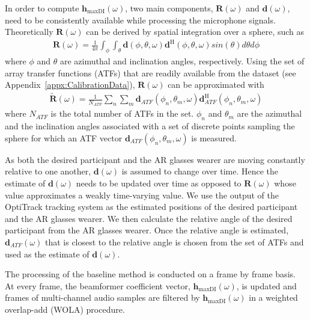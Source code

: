 \documentclass[journal]{IEEEtran}
\begin{document}
In order to compute $\mathbf{h}_{\mathrm{maxDI}}(\omega)$, two main components, $\mathbf{R}(\omega)$ and $\mathbf{d}(\omega)$, need to be consistently available while processing the microphone signals.
Theoretically $\mathbf{R}(\omega)$  can be  derived by spatial integration over a sphere, such as
\begin{align}
\mathbf{R}(\omega) = \frac{1}{4\pi} \int_{\phi} \int_{\theta} \mathbf{d}(\phi, \theta, \omega) \mathbf{d}^{\mathrm{H}}(\phi, \theta, \omega) sin(\theta)d\theta d\phi
\label{eq:R_original}
\end{align}
where $\phi$ and $\theta$ are azimuthal and inclination angles, respectively. Using the set of array transfer functions (ATFs) that are readily available from the dataset (see Appendix~\ref{appx:CalibrationData}), $\mathbf{R}(\omega)$ can be approximated with
\begin{align}
\mathbf{\tilde{R}}(\omega) = \frac{1}{N_{ATF}}\sum_{n} \sum_{m} \mathbf{d}_{ATF}(\phi_{n}, \theta_{m}, \omega)\mathbf{d}^{\mathrm{H}}_{ATF}(\phi_{n}, \theta_{m}, \omega)
\end{align}
where $N_{ATF}$ is the total number of ATFs in the set. $\phi_{n}$ and $\theta_{m}$ are the azimuthal and the inclination angles associated with a set of discrete points sampling the sphere for which an ATF vector $\mathbf{d}_{ATF}(\phi_{n}, \theta_{m}, \omega)$ is measured.

As both the desired participant and the AR glasses wearer are moving constantly relative to one another, $\mathbf{d}(\omega)$ is assumed to change over time. Hence the estimate of $\mathbf{d}(\omega)$ needs to be updated over time as opposed to $\mathbf{R}(\omega)$ whose value approximates a weakly time-varying value. We use the output of the OptiTrack tracking system as the estimated positions of the desired participant and the AR glasses
wearer. We then calculate the relative angle of the desired participant from the AR glasses wearer. Once the relative angle is estimated, $\mathbf{d}_{ATF}(\omega)$ that is closest to the relative angle is chosen from the set of ATFs and used as the estimate of $\mathbf{d}(\omega)$.

The processing of the baseline method is conducted on a frame by frame basis. At every frame, the beamformer coefficient vector, $\mathbf{h}_{\mathrm{maxDI}}(\omega)$, is updated and frames of multi-channel audio samples are filtered by $\mathbf{h}_{\mathrm{maxDI}}(\omega)$ in a weighted overlap-add (WOLA) procedure.

 
\end{document}
